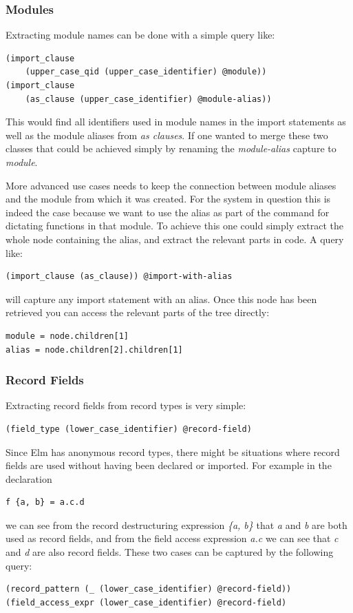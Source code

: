 \documentclass[../thesis.tex]{subfiles}
\begin{document}
\subsubsection{Modules}
Extracting module names can be done with a simple query like:
\begin{verbatim}
(import_clause 
    (upper_case_qid (upper_case_identifier) @module))
(import_clause 
    (as_clause (upper_case_identifier) @module-alias))
\end{verbatim}
This would find all identifiers used in module names in the import statements as well as the module aliases from \textit{as clauses}.
If one wanted to merge these two classes that could be achieved simply by renaming the \textit{module-alias} capture to \textit{module}.

More advanced use cases needs to keep the connection between module aliases and the module from which it was created.
For the system in question this is indeed the case because we want to use the alias as part of the command for dictating functions in that module.
To achieve this one could simply extract the whole node containing the alias, and extract the relevant parts in code.
A query like:
\begin{verbatim}
(import_clause (as_clause)) @import-with-alias
\end{verbatim}
will capture any import statement with an alias.
Once this node has been retrieved you can access the relevant parts of the tree directly:
\begin{verbatim}
module = node.children[1]
alias = node.children[2].children[1]
\end{verbatim}

\subsubsection{Record Fields}
Extracting record fields from record types is very simple:
\begin{verbatim}
(field_type (lower_case_identifier) @record-field)
\end{verbatim}
Since Elm has anonymous record types, there might be situations where record fields are used
without having been declared or imported.
For example in the declaration
\begin{verbatim}
f {a, b} = a.c.d
\end{verbatim}
we can see from the record destructuring expression \textit{\{a, b\}} that \textit{a} and \textit{b} are both used as record fields,
and from the field access expression \textit{a.c} we can see that \textit{c} and \textit{d} are also record fields.
These two cases can be captured by the following query:
\begin{verbatim}
(record_pattern (_ (lower_case_identifier) @record-field))
(field_access_expr (lower_case_identifier) @record-field)
\end{verbatim}
\end{document}
